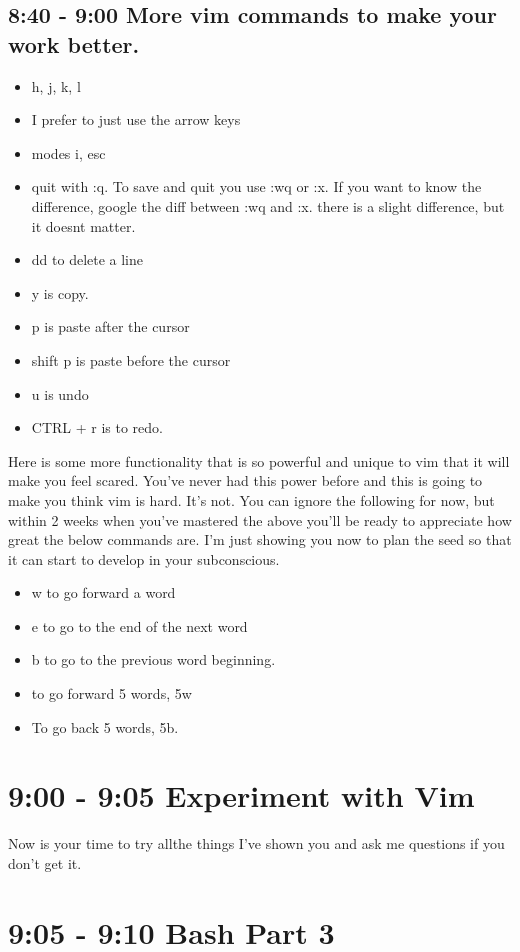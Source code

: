 \documentclass[10pt]{article}
\begin{document}
\subsection*{ 8:40 - 9:00 More vim commands to make your work better.}
\begin{itemize}
\item h, j, k, l
\item I prefer to just use the arrow keys
\item modes i, esc
\item quit with :q. To save and quit you use :wq or :x. If you want to know the difference, google the diff between :wq and :x. there is a slight difference, but it doesnt matter.
\item dd to delete a line
\item y is copy.
\item p is paste after the cursor
\item shift p is paste before the cursor
\item u is undo
\item CTRL + r is to redo.
\end{itemize}

Here is some more functionality that is so powerful and unique to vim that it
will make you feel scared. You've never had this power before and this is going
to make you think vim is hard. It's not. You can ignore the following for now,
but within 2 weeks when you've mastered the above you'll be ready to appreciate
how great the below commands are. I'm just showing you now to plan the seed so
that it can start to develop in your subconscious.

\begin{itemize}
\item w to go forward a word
\item e to go to the end of the next word
\item b to go to the previous word beginning.
\item to go forward 5 words, 5w
\item To go back 5 words, 5b.
\end{itemize}

\section*{ 9:00 - 9:05 Experiment with Vim}
Now is your time to try allthe things I've shown you and ask me questions if you
don't get it.

\section*{ 9:05 - 9:10 Bash Part 3 }
\end{document}
